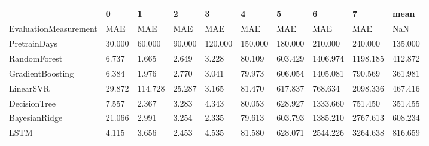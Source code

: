 \begin{tabular}{llllllllll}
\toprule
{} &      0 &       1 &      2 &       3 &       4 &       5 &        6 &        7 &    mean \\
\midrule
EvaluationMeasurement &    MAE &     MAE &    MAE &     MAE &     MAE &     MAE &      MAE &      MAE &     NaN \\
PretrainDays          & 30.000 &  60.000 & 90.000 & 120.000 & 150.000 & 180.000 &  210.000 &  240.000 & 135.000 \\
RandomForest          &  6.737 &   1.665 &  2.649 &   3.228 &  80.109 & 603.429 & 1406.974 & 1198.185 & 412.872 \\
GradientBoosting      &  6.384 &   1.976 &  2.770 &   3.041 &  79.973 & 606.054 & 1405.081 &  790.569 & 361.981 \\
LinearSVR             & 29.872 & 114.728 & 25.287 &   3.165 &  81.470 & 617.837 &  768.634 & 2098.336 & 467.416 \\
DecisionTree          &  7.557 &   2.367 &  3.283 &   4.343 &  80.053 & 628.927 & 1333.660 &  751.450 & 351.455 \\
BayesianRidge         & 21.066 &   2.991 &  3.254 &   2.335 &  79.613 & 603.793 & 1385.210 & 2767.613 & 608.234 \\
LSTM                  &  4.115 &   3.656 &  2.453 &   4.535 &  81.580 & 628.071 & 2544.226 & 3264.638 & 816.659 \\
\bottomrule
\end{tabular}
